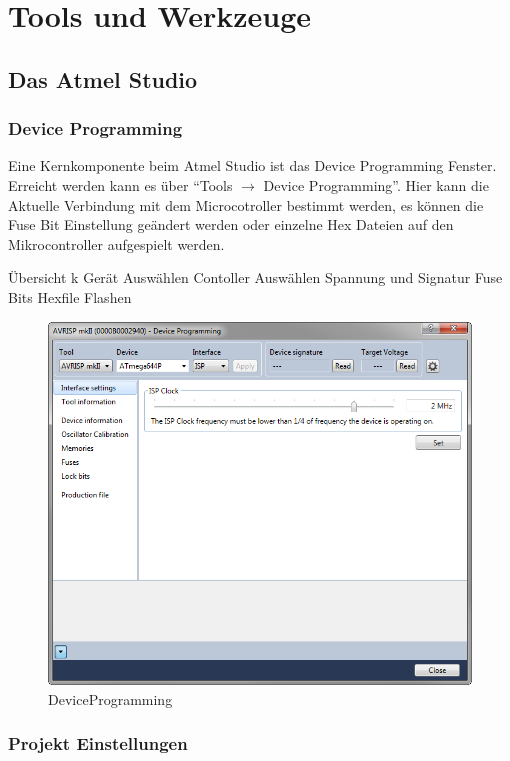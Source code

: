 \section{Tools und Werkzeuge}

\subsection{Das Atmel Studio}

\subsubsection{Device Programming}

Eine Kernkomponente beim Atmel Studio ist das Device Programming Fenster.
Erreicht werden kann es über "`Tools $\to$  Device Programming"'.
Hier kann die Aktuelle Verbindung mit dem Microcotroller bestimmt werden, es
können die Fuse Bit Einstellung geändert werden oder einzelne Hex
Dateien auf den Mikrocontroller aufgespielt werden.



Übersicht k Gerät Auswählen
Contoller Auswählen
Spannung und Signatur
Fuse Bits
Hexfile Flashen

\begin{figure}[h]
\centering
\includegraphics[width=13cm]{content/pictures/Anleitung/neuerProzessor/AnleitungNeuerProzessor1.png}
\caption{DeviceProgramming}
\label{fig:B3}
\end{figure}

\subsubsection{Projekt Einstellungen}

